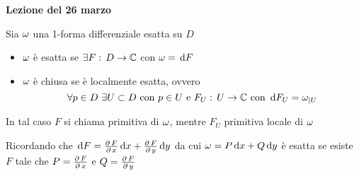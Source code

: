 

\textbf{Lezione del 26 marzo}
\begin{defn}Sia $\omega$ una 1-forma differenziale esatta su $D$ 
\begin{itemize}
\item $\omega$ \`e esatta se $\exists F:\, D\to \mathbb{C}$ con $\omega =\, \mathrm{d} F$
\item $\omega$ \`e chiusa se \`e localmente esatta, ovvero 
$$\forall p\in D\, \, \exists U \subset D \text{ con } p\in U \text{ e } F_U:\, U \to \mathbb{C} \text{ con } \, \mathrm{d} F_U =\omega_{\vert U} $$
\end{itemize}
In tal caso $F$ si chiama primitiva di $\omega$, mentre $F_U$ primitiva locale di $\omega$
\end{defn}
\begin{oss}
Ricordando che 
$\, \mathrm{d} F = \frac{\partial \, F}{\partial\, x} \, \mathrm{d} x + \frac{\partial \, F}{\partial\, y} \, \mathrm{d} y $ da cui $\omega=P\, \mathrm{d} x + Q \, \mathrm{d} y $ \`e esatta se esiste $F$ tale che $P =\frac{\partial \, F}{\partial\, x} $ e $Q = \frac{\partial \, F}{\partial\, y} $
\end{oss}
